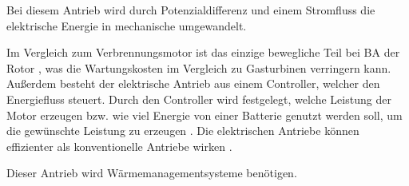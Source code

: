 
Bei diesem Antrieb wird durch Potenzialdifferenz und einem Stromfluss die elektrische Energie in mechanische umgewandelt.

Im Vergleich zum Verbrennungsmotor ist das einzige bewegliche Teil bei BA der Rotor \cite{donckers2024electric}, 
was die Wartungskosten im Vergleich zu Gasturbinen verringern kann. 
Außerdem besteht der elektrische Antrieb aus einem Controller, welcher den Energiefluss steuert. 
Durch den Controller wird festgelegt, welche Leistung der Motor erzeugen bzw. wie viel Energie von 
einer Batterie genutzt werden soll, um die gewünschte Leistung zu erzeugen \cite{donckers2024electric}. 
Die elektrischen Antriebe können effizienter als konventionelle Antriebe wirken \cite{hepperle2012electric}.

Dieser Antrieb wird Wärmemanagementsysteme benötigen. 


